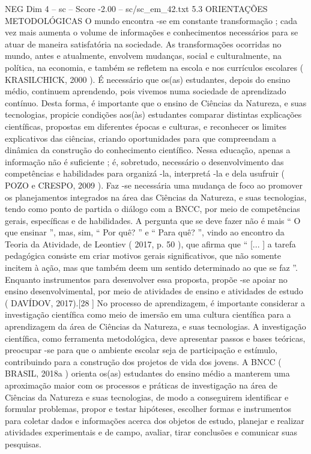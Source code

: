 \begin{textsample}{NEG Dim 4 – sc – Score -2.00 – sc/sc\_em\_42.txt}  \label{ex:f4_neg_259}
5.3 ORIENTAÇÕES METODOLÓGICAS O mundo encontra -se em constante transformação ; cada vez mais aumenta o volume de informações e conhecimentos necessários para se atuar de maneira satisfatória na sociedade.
As transformações ocorridas no mundo, antes e atualmente, envolvem mudanças, social e culturalmente, na política, na economia, e também se refletem na escola e nos currículos escolares ( KRASILCHICK, 2000 ).
É necessário que os(as) estudantes, depois do ensino médio, continuem aprendendo, pois vivemos numa sociedade de aprendizado contínuo.
Desta forma, é importante que o ensino de Ciências da Natureza, e suas tecnologias, propicie condições aos(às) estudantes comparar distintas explicações científicas, propostas em diferentes épocas e culturas, e reconhecer os limites explicativos das ciências, criando oportunidades para que compreendam a dinâmica da construção do conhecimento científico.
Nessa educação, apenas a informação não é suficiente ; é, sobretudo, necessário o desenvolvimento das competências e habilidades para organizá -la, interpretá -la e dela usufruir ( POZO e CRESPO, 2009 ).
Faz -se necessária uma mudança de foco ao promover os planejamentos integrados na área das Ciências da Natureza, e suas tecnologias, tendo como ponto de partida o diálogo com a BNCC, por meio de competências gerais, específicas e de habilidades.
A pergunta que se deve fazer não é mais “ O que ensinar ”, mas, sim, “ Por quê? ” e “ Para quê? ”, vindo ao encontro da Teoria da Atividade, de Leontiev ( 2017, p. 50 ), que afirma que “ [... ] a tarefa pedagógica consiste em criar motivos gerais significativos, que não somente incitem à ação, mas que também deem um sentido determinado ao que se faz ”.
Enquanto instrumentos para desenvolver essa proposta, propõe -se apoiar no ensino desenvolvimental, por meio de atividades de ensino e atividades de estudo ( DAVÍDOV, 2017).[28 ] No processo de aprendizagem, é importante considerar a investigação científica como meio de imersão em uma cultura científica para a aprendizagem da área de Ciências da Natureza, e suas tecnologias.
A investigação científica, como ferramenta metodológica, deve apresentar passos e bases teóricas, preocupar -se para que o ambiente escolar seja de participação e estímulo, contribuindo para a construção dos projetos de vida dos jovens.
A BNCC ( BRASIL, 2018a ) orienta os(as) estudantes do ensino médio a manterem uma aproximação maior com os processos e práticas de investigação na área de Ciências da Natureza e suas tecnologias, de modo a conseguirem identificar e formular problemas, propor e testar hipóteses, escolher formas e instrumentos para coletar dados e informações acerca dos objetos de estudo, planejar e realizar atividades experimentais e de campo, avaliar, tirar conclusões e comunicar suas pesquisas.

\end{textsample}
